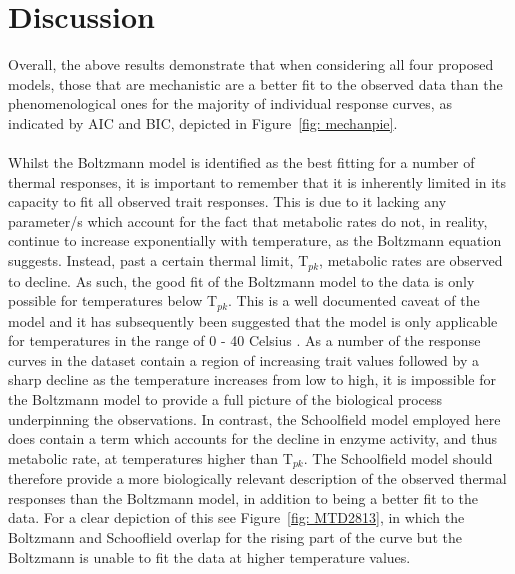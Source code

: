 \documentclass[11pt]{article}
\begin{document}
\section{Discussion}
Overall, the above results demonstrate that when considering all four proposed models, those that are mechanistic are a better fit to the observed data than the phenomenological ones for the majority of individual response curves, as indicated by AIC and BIC, depicted in Figure~\ref{fig: mechanpie}.
\\
\\
Whilst the Boltzmann model is identified as the best fitting for a number of thermal responses, it is important to remember that it is inherently limited in its capacity to fit all observed trait responses. This is due to it lacking any parameter/s which account for the fact that metabolic rates do not, in reality, continue to increase exponentially with temperature, as the Boltzmann equation suggests. Instead, past a certain thermal limit, T\begin{math}_{pk}\end{math}, metabolic rates are observed to decline. As such, the good fit of the Boltzmann model to the data is only possible for temperatures below T\begin{math}_{pk}\end{math}. This is a well documented caveat of the model and it has subsequently been suggested that the model is only applicable for temperatures in the range of 0 - 40 \degree Celsius \cite{knies2010erroneous, brown2004toward, gillooly2001effects}. As a number of the response curves in the dataset contain a region of increasing trait values followed by a sharp decline as the temperature increases from low to high, it is impossible for the Boltzmann model to provide a full picture of the biological process underpinning the observations. In contrast, the Schoolfield model employed here does contain a term which accounts for the decline in enzyme activity, and thus metabolic rate, at temperatures higher than T\begin{math}_{pk}\end{math}. The Schoolfield model should therefore provide a more biologically relevant description of the observed thermal responses than the Boltzmann model, in addition to being a better fit to the data. For a clear depiction of this see Figure~\ref{fig: MTD2813}, in which the Boltzmann and Schooflield overlap for the rising part of the curve but the Boltzmann is unable to fit the data at higher temperature values.
\\
\end{document}
